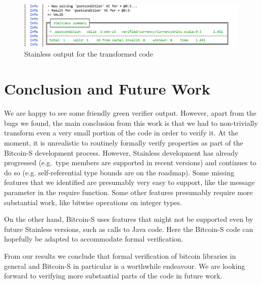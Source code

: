 \documentclass[hyphens, a4paper,USenglish,cleveref, autoref, thm-restate]{oasics-v2019}
\begin{document}
\begin{figure}
	\centering
		\includegraphics[width=\textwidth]{result_output}
	\caption{Stainless output for the transformed code}
  \label{fig:result}
\end{figure}


\section{Conclusion and Future Work}

We are happy to see some friendly green verifier output. However,
apart from the bugs we found, the main conclusion from this work is
that we had to non-trivially transform even a very small portion of
the code in order to verify it. At the moment, it is unrealistic to
routinely formally verify properties as part of the Bitcoin-S
development process. However, Stainless development has already
progressed (e.g.\ type members are supported in recent versions) and
continues to do so (e.g. self-referential type bounds are on the
roadmap). Some missing features that we identified are presumably very
easy to support, like the message parameter in the require
function. Some other features presumably require more substantial
work, like bitwise operations on integer types.

On the other hand, Bitcoin-S uses features that might not be supported
even by future Stainless versions, such as calls to Java code. Here
the Bitcoin-S code can hopefully be adapted to accommodate formal
verification.

From our results we conclude that formal verification of bitcoin
libraries in general and Bitcoin-S in particular is a worthwhile
endeavour. We are looking forward to verifying more substantial parts
of the code in future work.

\appendix


\end{document}
